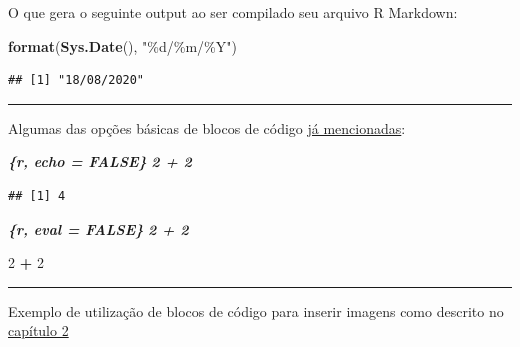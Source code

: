 \documentclass[
]{book}
\newenvironment{Shaded}{\begin{snugshade}}{\end{snugshade}}
\newcommand{\DecValTok}[1]{\textcolor[rgb]{0.00,0.00,0.81}{#1}}
\newcommand{\InformationTok}[1]{\textcolor[rgb]{0.56,0.35,0.01}{\textbf{\textit{#1}}}}
\newcommand{\KeywordTok}[1]{\textcolor[rgb]{0.13,0.29,0.53}{\textbf{#1}}}
\newcommand{\NormalTok}[1]{#1}
\newcommand{\OperatorTok}[1]{\textcolor[rgb]{0.81,0.36,0.00}{\textbf{#1}}}
\newcommand{\StringTok}[1]{\textcolor[rgb]{0.31,0.60,0.02}{#1}}
\begin{document}
O que gera o seguinte output ao ser compilado seu arquivo R Markdown:

\begin{Shaded}
\begin{Highlighting}[]
\KeywordTok{format}\NormalTok{(}\KeywordTok{Sys.Date}\NormalTok{(), }\StringTok{"\%d/\%m/\%Y"}\NormalTok{)}
\end{Highlighting}
\end{Shaded}

\begin{verbatim}
## [1] "18/08/2020"
\end{verbatim}

\begin{center}\rule{0.5\linewidth}{0.5pt}\end{center}

Algumas das opções básicas de blocos de código \protect\hyperlink{flags}{já mencionadas}:

\begin{Shaded}
\begin{Highlighting}[]
\InformationTok{\textasciigrave{}\textasciigrave{}\textasciigrave{}\{r, echo = FALSE\}}
\InformationTok{2 + 2}
\InformationTok{\textasciigrave{}\textasciigrave{}\textasciigrave{}}
\end{Highlighting}
\end{Shaded}

\begin{verbatim}
## [1] 4
\end{verbatim}

\begin{Shaded}
\begin{Highlighting}[]
\InformationTok{\textasciigrave{}\textasciigrave{}\textasciigrave{}\{r, eval = FALSE\}}
\InformationTok{2 + 2}
\InformationTok{\textasciigrave{}\textasciigrave{}\textasciigrave{}}
\end{Highlighting}
\end{Shaded}

\begin{Shaded}
\begin{Highlighting}[]
\DecValTok{2} \OperatorTok{+}\StringTok{ }\DecValTok{2}
\end{Highlighting}
\end{Shaded}

\begin{center}\rule{0.5\linewidth}{0.5pt}\end{center}

Exemplo de utilização de blocos de código para inserir imagens como descrito no \protect\hyperlink{inserindo-imagens}{capítulo 2}
\end{document}
